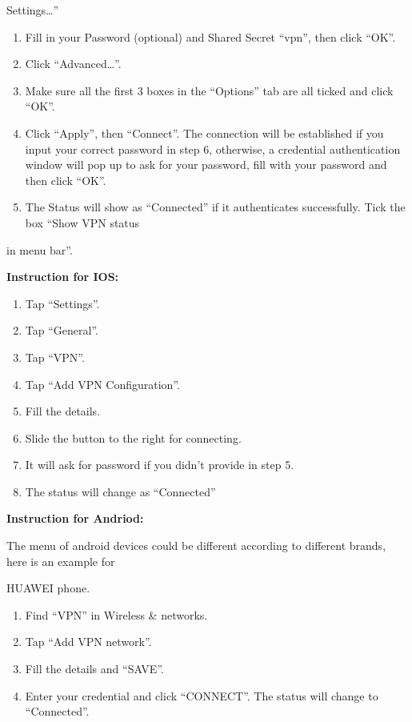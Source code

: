 \documentclass[
]{book}
\providecommand{\tightlist}{%
  \setlength{\itemsep}{0pt}\setlength{\parskip}{0pt}}
\begin{document}
Settings\ldots''

\begin{enumerate}
\def\labelenumi{\arabic{enumi}.}
\setcounter{enumi}{5}
\tightlist
\item
  Fill in your Password (optional) and Shared Secret ``vpn'', then click ``OK''.
\item
  Click ``Advanced\ldots{}''.
\item
  Make sure all the first 3 boxes in the ``Options'' tab are all ticked and click ``OK''.
\item
  Click ``Apply'', then ``Connect''. The connection will be established if you input your correct password in step 6, otherwise, a credential authentication window will pop up to ask for your password, fill with your password and then click ``OK''.
\item
  The Status will show as ``Connected'' if it authenticates successfully. Tick the box ``Show VPN status
\end{enumerate}

in menu bar''.

\textbf{Instruction for IOS:}

\begin{enumerate}
\def\labelenumi{\arabic{enumi}.}
\tightlist
\item
  Tap ``Settings''.
\item
  Tap ``General''.
\item
  Tap ``VPN''.
\item
  Tap ``Add VPN Configuration''.
\item
  Fill the details.
\item
  Slide the button to the right for connecting.
\item
  It will ask for password if you didn't provide in step 5.
\item
  The status will change as ``Connected''
\end{enumerate}

\textbf{Instruction for Andriod:}

The menu of android devices could be different according to different brands, here is an example for

HUAWEI phone.

\begin{enumerate}
\def\labelenumi{\arabic{enumi}.}
\tightlist
\item
  Find ``VPN'' in Wireless \& networks.
\item
  Tap ``Add VPN network''.
\item
  Fill the details and ``SAVE''.
\item
  Enter your credential and click ``CONNECT''. The status will change to ``Connected''.
\end{enumerate}
\end{document}
